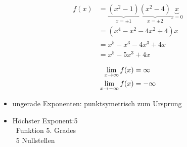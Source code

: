 \begin{align*}
	f(x) & = \underbrace{(x^2-1)}_{x = \pm 1}
	\underbrace{(x^2-4)}_{x = \pm 2}
	\underbrace{x}_{x = 0}                    \\
	     & = (x^4 - x^2 - 4x^2 + 4)x          \\
	     & = x^5 - x^3 - 4x^3 +4x             \\
	     & = x^5 - 5x^3 + 4x
\end{align*}

\begin{align*}
	\lim_{x \rightarrow{} \infty} f(x)    & = \infty  \\
	\lim_{x \rightarrow{} -\infty} f(x) & = -\infty
\end{align*}

\begin{itemize}
	\item ungerade Exponenten: punktsymetrisch zum Ursprung
	\item Höchster Exponent:5 \\
	      \textrightarrow\ Funktion 5. Grades \\
	      \textrightarrow\ 5 Nullstellen
\end{itemize}
